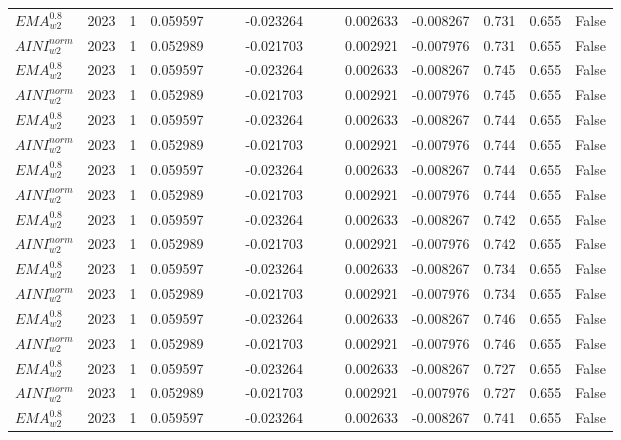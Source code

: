 \begin{tabular}{@{}llrrrrrrrrrlll@{}}
$EMA^{0.8}_{w2}$ & 2023 & 1 & 0.059597 &  &  & -0.023264 &  &  & 0.002633 & -0.008267 & 0.731 & 0.655 & False \\
$AINI^{norm}_{w2}$ & 2023 & 1 & 0.052989 &  &  & -0.021703 &  &  & 0.002921 & -0.007976 & 0.731 & 0.655 & False \\
$EMA^{0.8}_{w2}$ & 2023 & 1 & 0.059597 &  &  & -0.023264 &  &  & 0.002633 & -0.008267 & 0.745 & 0.655 & False \\
$AINI^{norm}_{w2}$ & 2023 & 1 & 0.052989 &  &  & -0.021703 &  &  & 0.002921 & -0.007976 & 0.745 & 0.655 & False \\
$EMA^{0.8}_{w2}$ & 2023 & 1 & 0.059597 &  &  & -0.023264 &  &  & 0.002633 & -0.008267 & 0.744 & 0.655 & False \\
$AINI^{norm}_{w2}$ & 2023 & 1 & 0.052989 &  &  & -0.021703 &  &  & 0.002921 & -0.007976 & 0.744 & 0.655 & False \\
$EMA^{0.8}_{w2}$ & 2023 & 1 & 0.059597 &  &  & -0.023264 &  &  & 0.002633 & -0.008267 & 0.744 & 0.655 & False \\
$AINI^{norm}_{w2}$ & 2023 & 1 & 0.052989 &  &  & -0.021703 &  &  & 0.002921 & -0.007976 & 0.744 & 0.655 & False \\
$EMA^{0.8}_{w2}$ & 2023 & 1 & 0.059597 &  &  & -0.023264 &  &  & 0.002633 & -0.008267 & 0.742 & 0.655 & False \\
$AINI^{norm}_{w2}$ & 2023 & 1 & 0.052989 &  &  & -0.021703 &  &  & 0.002921 & -0.007976 & 0.742 & 0.655 & False \\
$EMA^{0.8}_{w2}$ & 2023 & 1 & 0.059597 &  &  & -0.023264 &  &  & 0.002633 & -0.008267 & 0.734 & 0.655 & False \\
$AINI^{norm}_{w2}$ & 2023 & 1 & 0.052989 &  &  & -0.021703 &  &  & 0.002921 & -0.007976 & 0.734 & 0.655 & False \\
$EMA^{0.8}_{w2}$ & 2023 & 1 & 0.059597 &  &  & -0.023264 &  &  & 0.002633 & -0.008267 & 0.746 & 0.655 & False \\
$AINI^{norm}_{w2}$ & 2023 & 1 & 0.052989 &  &  & -0.021703 &  &  & 0.002921 & -0.007976 & 0.746 & 0.655 & False \\
$EMA^{0.8}_{w2}$ & 2023 & 1 & 0.059597 &  &  & -0.023264 &  &  & 0.002633 & -0.008267 & 0.727 & 0.655 & False \\
$AINI^{norm}_{w2}$ & 2023 & 1 & 0.052989 &  &  & -0.021703 &  &  & 0.002921 & -0.007976 & 0.727 & 0.655 & False \\
$EMA^{0.8}_{w2}$ & 2023 & 1 & 0.059597 &  &  & -0.023264 &  &  & 0.002633 & -0.008267 & 0.741 & 0.655 & False \\

\end{tabular}
